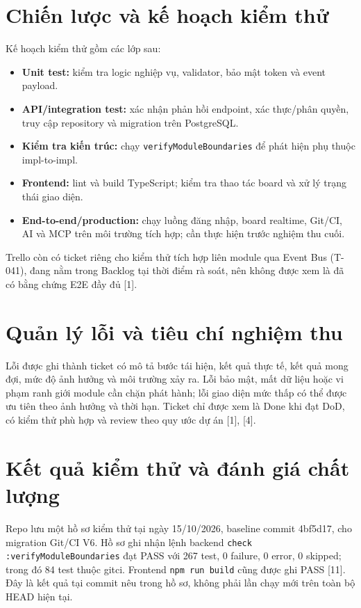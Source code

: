 \documentclass[12pt,a4paper]{report}
\begin{document}
\section{Chiến lược và kế hoạch kiểm thử}
Kế hoạch kiểm thử gồm các lớp sau:
\begin{itemize}
    \item \textbf{Unit test:} kiểm tra logic nghiệp vụ, validator, bảo mật token và event payload.
    \item \textbf{API/integration test:} xác nhận phản hồi endpoint, xác thực/phân quyền, truy cập repository và migration trên PostgreSQL.
    \item \textbf{Kiểm tra kiến trúc:} chạy \texttt{verifyModuleBoundaries} để phát hiện phụ thuộc impl-to-impl.
    \item \textbf{Frontend:} lint và build TypeScript; kiểm tra thao tác board và xử lý trạng thái giao diện.
    \item \textbf{End-to-end/production:} chạy luồng đăng nhập, board realtime, Git/CI, AI và MCP trên môi trường tích hợp; cần thực hiện trước nghiệm thu cuối.
\end{itemize}
Trello còn có ticket riêng cho kiểm thử tích hợp liên module qua Event Bus (T-041), đang nằm trong Backlog tại thời điểm rà soát, nên không được xem là đã có bằng chứng E2E đầy đủ [1].

\section{Quản lý lỗi và tiêu chí nghiệm thu}
Lỗi được ghi thành ticket có mô tả bước tái hiện, kết quả thực tế, kết quả mong đợi, mức độ ảnh hưởng và môi trường xảy ra. Lỗi bảo mật, mất dữ liệu hoặc vi phạm ranh giới module cần chặn phát hành; lỗi giao diện mức thấp có thể được ưu tiên theo ảnh hưởng và thời hạn. Ticket chỉ được xem là Done khi đạt DoD, có kiểm thử phù hợp và review theo quy ước dự án [1], [4].

\section{Kết quả kiểm thử và đánh giá chất lượng}
Repo lưu một hồ sơ kiểm thử tại ngày 15/10/2026, baseline commit 4bf5d17, cho migration Git/CI V6. Hồ sơ ghi nhận lệnh backend \texttt{check :verifyModuleBoundaries} đạt PASS với 267 test, 0 failure, 0 error, 0 skipped; trong đó 84 test thuộc gitci. Frontend \texttt{npm run build} cũng được ghi PASS [11]. Đây là kết quả tại commit nêu trong hồ sơ, không phải lần chạy mới trên toàn bộ HEAD hiện tại.
\end{document}
